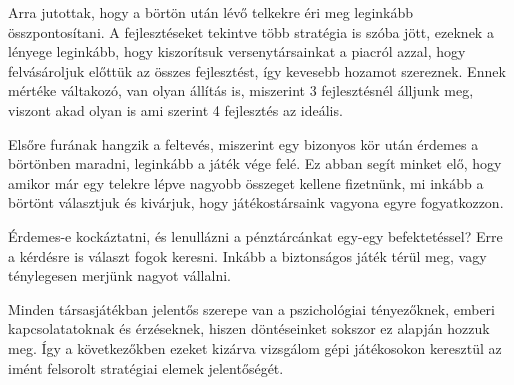 Arra jutottak, hogy a börtön után lévő telkekre éri meg leginkább összpontosítani. A fejlesztéseket tekintve több stratégia is szóba jött, ezeknek a lényege leginkább, hogy kiszorítsuk versenytársainkat a piacról azzal, hogy felvásároljuk előttük az összes fejlesztést, így kevesebb hozamot szereznek. Ennek mértéke váltakozó, van olyan állítás is, miszerint 3 fejlesztésnél álljunk meg, viszont akad olyan is ami szerint 4 fejlesztés az ideális.


Elsőre furának hangzik a feltevés, miszerint egy bizonyos kör után érdemes a börtönben maradni, leginkább a játék vége felé. Ez abban segít minket elő, hogy amikor már egy telekre lépve nagyobb összeget kellene fizetnünk, mi inkább a börtönt választjuk és kivárjuk, hogy játékostársaink vagyona egyre fogyatkozzon.


Érdemes-e kockáztatni, és lenullázni a pénztárcánkat egy-egy befektetéssel? Erre a kérdésre is választ fogok keresni. Inkább a biztonságos játék térül meg, vagy ténylegesen merjünk nagyot vállalni. 
\newpage

Minden társasjátékban jelentős szerepe van a pszichológiai tényezőknek, emberi kapcsolatatoknak és érzéseknek, hiszen döntéseinket sokszor ez alapján hozzuk meg. Így a következőkben ezeket kizárva vizsgálom gépi játékosokon keresztül az imént felsorolt stratégiai elemek jelentőségét.
